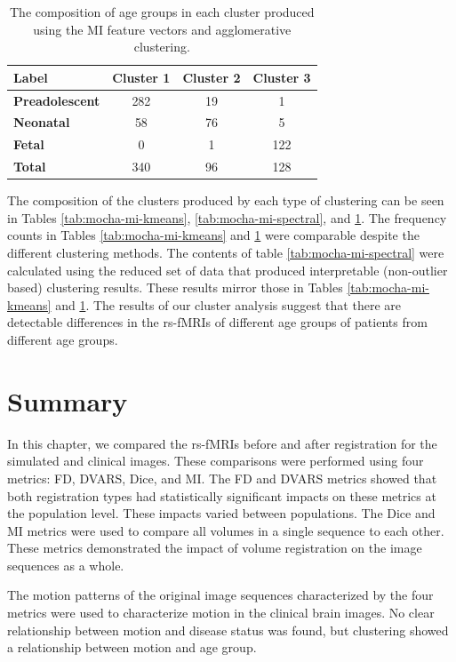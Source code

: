 \begin{table}[t!]
\centering
\caption{The composition of age groups in each cluster produced using the MI feature vectors and agglomerative clustering.}
\label{tab:mocha-mi-agg}
\begin{tabular}{|l|c|c|c|}
\hline
\textbf{Label} & \multicolumn{1}{l|}{\textbf{Cluster 1}} & \multicolumn{1}{l|}{\textbf{Cluster 2}} & \multicolumn{1}{l|}{\textbf{Cluster 3}} \\ \hline
\textbf{Preadolescent} & 282 & 19 & 1   \\ \hline
\textbf{Neonatal}      & 58  & 76 & 5   \\ \hline
\textbf{Fetal}         & 0   & 1  & 122 \\ \hline
\textbf{Total}         & 340 & 96 & 128 \\ \hline
\end{tabular}
\end{table}

The composition of the clusters produced by each type of clustering can be seen in Tables \ref{tab:mocha-mi-kmeans}, \ref{tab:mocha-mi-spectral}, and \ref{tab:mocha-mi-agg}. The frequency counts in Tables \ref{tab:mocha-mi-kmeans} and \ref{tab:mocha-mi-agg} were comparable despite the different clustering methods. The contents of table \ref{tab:mocha-mi-spectral} were calculated using the reduced set of data that produced interpretable (non-outlier based) clustering results. These results mirror those in Tables \ref{tab:mocha-mi-kmeans} and \ref{tab:mocha-mi-agg}. The results of our cluster analysis suggest that there are detectable differences in the rs-fMRIs of different age groups of patients from different age groups.

\vspace{-0.05\textwidth}
\section{Summary}

In this chapter, we compared the rs-fMRIs before and after registration for the simulated and clinical images. These comparisons were performed using four metrics: FD, DVARS, Dice, and MI. The FD and DVARS metrics showed that both registration types had statistically significant impacts on these metrics at the population level. These impacts varied between populations. The Dice and MI metrics were used to compare all volumes in a single sequence to each other. These metrics demonstrated the impact of volume registration on the image sequences as a whole. 

The motion patterns of the original image sequences characterized by the four metrics were used to characterize motion in the clinical brain images. No clear relationship between motion and disease status was found, but clustering showed a relationship between motion and age group.